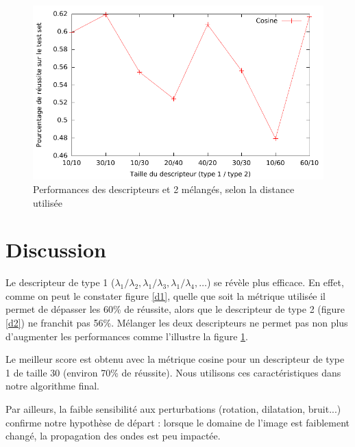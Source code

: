 \documentclass[a4paper,10pt]{article} %
\theoremstyle{definition} %
\begin{document}
\begin{figure}[H]
  \includegraphics[scale=1.15]{../plot/courbe3.pdf}
\caption{Performances des descripteurs  et 2 mélangés, selon la distance utilisée}
\label{d3}
\end{figure}


\section{Discussion}

Le descripteur de type 1 ($\lambda_1/\lambda_2, \lambda_1/\lambda_3, \lambda_1/\lambda_4, \dots$) se révèle plus efficace. En effet, comme on peut le constater figure \ref{d1}, quelle que soit la métrique utilisée il permet de dépasser les 60\% de réussite, alors que le descripteur de type 2 (figure \ref{d2}) ne franchit pas 56\%. Mélanger les deux descripteurs ne permet pas non plus d'augmenter les performances comme l'illustre la figure \ref{d3}.

Le meilleur score est obtenu avec la métrique cosine pour un descripteur de type 1 de taille 30 (environ 70\% de réussite). Nous utilisons ces caractéristiques dans notre algorithme final.

Par ailleurs, la faible sensibilité aux perturbations (rotation, dilatation, bruit...) confirme notre hypothèse de départ : lorsque le domaine de l'image est faiblement changé, la propagation des ondes est peu impactée.
\end{document}
